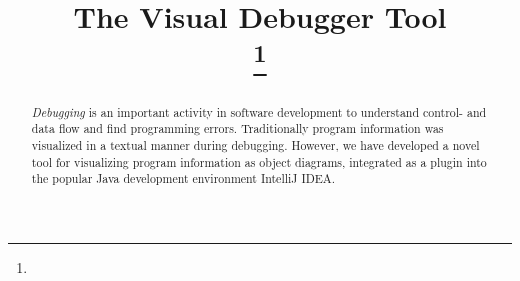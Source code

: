 \documentclass[conference]{IEEEtran}
\newcommand{\intellij}{IntelliJ IDEA}
\begin{document}
\title{The Visual Debugger Tool\\
{}
\thanks{}
}

\author{
}

\maketitle


\begin{abstract}
\emph{Debugging} is an important activity in software development to understand control- and data flow and find programming errors.
Traditionally program information was visualized in a textual manner during debugging.
However, we have developed a novel tool for visualizing program information as object diagrams, integrated as a plugin into the popular Java development environment \intellij{}.
\end{abstract}
\end{document}
